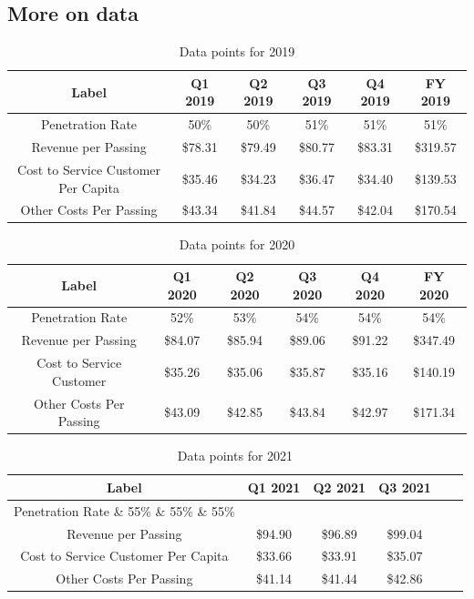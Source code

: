 \documentclass[a4paper,oneside]{article}
\begin{document}

	
\begin{appendices}

\pagebreak	
\section{More on data}\label{app:dat}
\pagebreak
\begin{table}%
	\centering
	\begin{tabular}{cccccc} 
		\toprule
		Label & Q1 2019 & Q2 2019 & Q3 2019 & Q4 2019 & FY 2019 \\
		\midrule
		Penetration Rate & 50\% & 50\% & 51\% & 51\% & 51\% \\
		Revenue per Passing & \$78.31 & \$79.49 & \$80.77 & \$83.31 & \$319.57 \\
		Cost to Service Customer Per Capita & \$35.46 & \$34.23 & \$36.47 & \$34.40 & \$139.53 \\
		Other Costs Per Passing & \$43.34 & \$41.84 & \$44.57 & \$42.04 & \$170.54 \\
		\bottomrule
	\end{tabular}
	\caption{Data points for 2019}
	\label{tab:myt1}
\end{table}
\begin{table}%
	\centering
	\begin{tabular}{cccccc} %
		\toprule			
			Label & Q1 2020 & Q2 2020 & Q3 2020 & Q4 2020 & FY 2020 \\
		\midrule
			Penetration Rate & 52\% & 53\% & 54\% & 54\% & 54\% \\
			Revenue per Passing & \$84.07 & \$85.94 & \$89.06 & \$91.22 & \$347.49 \\
			Cost to Service Customer & \$35.26 & \$35.06 & \$35.87 & \$35.16 & \$140.19 \\
			Other Costs Per Passing & \$43.09 & \$42.85 & \$43.84 & \$42.97 & \$171.34 \\
		\bottomrule
	\end{tabular}
	\caption{Data points for 2020}
	\label{tab:myt2}
\end{table}
\begin{table}%
	\centering
	\begin{tabular}{cccccc}\hline %
		\toprule			
		Label & Q1 2021 & Q2 2021 & Q3 2021 \\
		\midrule
			Penetration Rate \& 55\% \& 55\% \& 55\% \\
			Revenue per Passing & \$94.90 & \$96.89 & \$99.04 \\
			Cost to Service Customer Per Capita & \$33.66 & \$33.91 & \$35.07 \\
			Other Costs Per Passing & \$41.14 & \$41.44 & \$42.86 \\
		\bottomrule
	\end{tabular}
	\caption{Data points for 2021}
	\label{tab:myt3}
\end{table}


\end{appendices}
\end{document}
